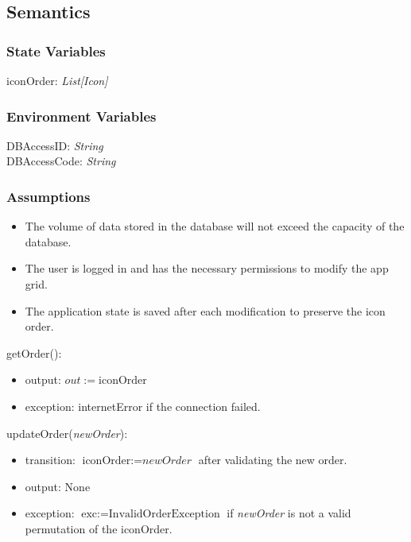 \documentclass[12pt, titlepage]{article}
\begin{document}
\subsection{Semantics}

\subsubsection{State Variables}

iconOrder: \textit{List[Icon]}\\


\subsubsection{Environment Variables}

DBAccessID: \textit{String}\\
DBAccessCode: \textit{String}\\


\subsubsection{Assumptions}

\begin{itemize}
  \item The volume of data stored in the database will not exceed the capacity of the database.
  \item The user is logged in and has the necessary permissions to modify the app grid.
  \item The application state is saved after each modification to preserve the icon order.

\end{itemize}

\noindent getOrder():
\begin{itemize}
\item output: \( out := \text{iconOrder} \)
\item exception: internetError if the connection failed. \\
\end{itemize}

\noindent updateOrder(\textit{newOrder}):
\begin{itemize}
\item transition: \( \text{iconOrder} := \textit{newOrder} \) after validating the new order.
\item output: None
\item exception: \( \text{exc} := \text{InvalidOrderException} \) if \textit{newOrder} is not a valid permutation of the iconOrder.
\end{itemize}
\end{document}
